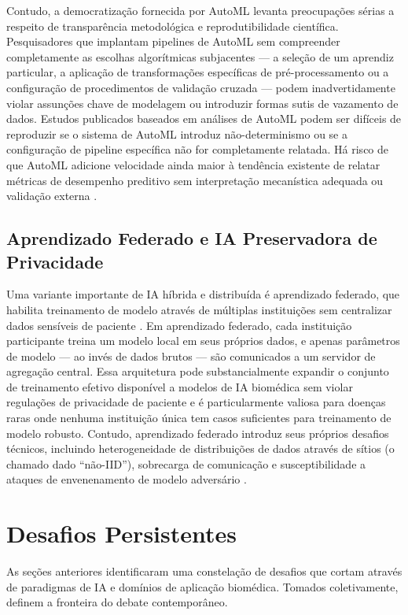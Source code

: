 Contudo, a democratização fornecida por AutoML levanta preocupações sérias a respeito de transparência metodológica e reprodutibilidade científica. Pesquisadores que implantam pipelines de AutoML sem compreender completamente as escolhas algorítmicas subjacentes --- a seleção de um aprendiz particular, a aplicação de transformações específicas de pré-processamento ou a configuração de procedimentos de validação cruzada --- podem inadvertidamente violar assunções chave de modelagem ou introduzir formas sutis de vazamento de dados. Estudos publicados baseados em análises de AutoML podem ser difíceis de reproduzir se o sistema de AutoML introduz não-determinismo ou se a configuração de pipeline específica não for completamente relatada. Há risco de que AutoML adicione velocidade ainda maior à tendência existente de relatar métricas de desempenho preditivo sem interpretação mecanística adequada ou validação externa \parencite{kapoor2023}.

\subsection{Aprendizado Federado e IA Preservadora de Privacidade}

Uma variante importante de IA híbrida e distribuída é aprendizado federado, que habilita treinamento de modelo através de múltiplas instituições sem centralizar dados sensíveis de paciente \parencite{rieke2020}. Em aprendizado federado, cada instituição participante treina um modelo local em seus próprios dados, e apenas parâmetros de modelo --- ao invés de dados brutos --- são comunicados a um servidor de agregação central. Essa arquitetura pode substancialmente expandir o conjunto de treinamento efetivo disponível a modelos de IA biomédica sem violar regulações de privacidade de paciente e é particularmente valiosa para doenças raras onde nenhuma instituição única tem casos suficientes para treinamento de modelo robusto. Contudo, aprendizado federado introduz seus próprios desafios técnicos, incluindo heterogeneidade de distribuições de dados através de sítios (o chamado dado ``não-IID''), sobrecarga de comunicação e susceptibilidade a ataques de envenenamento de modelo adversário \parencite{kairouz2021}.

\section{Desafios Persistentes}

As seções anteriores identificaram uma constelação de desafios que cortam através de paradigmas de IA e domínios de aplicação biomédica. Tomados coletivamente, definem a fronteira do debate contemporâneo.


